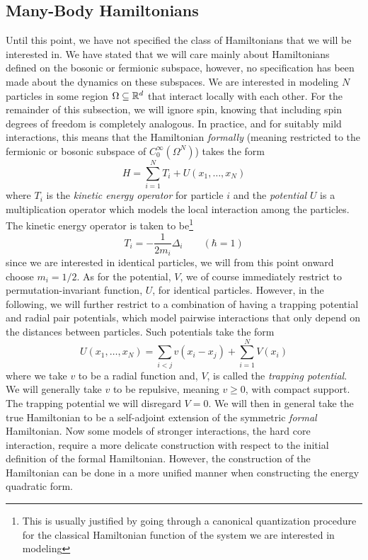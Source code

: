 \subsection{Many-Body Hamiltonians}
Until this point, we have not specified the class of Hamiltonians that we will be interested in. We have stated that we will care mainly about Hamiltonians defined on the bosonic or fermionic subspace, however, no specification has been made about the dynamics on these subspaces. We are interested in modeling $ N $ particles in some region $ \Omega\subseteq\mathbb{R}^d $ that interact locally with each other. For the remainder of this subsection, we will ignore spin, knowing that including spin degrees of freedom is completely analogous. In practice, and for suitably mild interactions, this means that the Hamiltonian \emph{formally} (meaning restricted to the fermionic or bosonic subspace of $ C^\infty_0(\Omega^N) $) takes the form \begin{equation}
H=\sum_{i=1}^{N}T_i+U(x_1,\ldots,x_N)
\end{equation}
where $ T_i $ is the \emph{kinetic energy operator} for particle $ i $ and the \emph{potential} $ U $ is a multiplication operator which models the local interaction among the particles. The kinetic energy operator is taken to be\footnote{This is usually justified by going through a canonical quantization procedure for the classical Hamiltonian function of the system we are interested in modeling} \begin{equation}
T_i=-\frac{1}{2m_i}\Delta_i\qquad (\hbar=1)
\end{equation} 
since we are interested in identical particles, we will from this point onward choose $ m_i=1/2 $. As for the potential, $ V $, we of course immediately restrict to permutation-invariant function, $ U $, for identical particles. However, in the following, we will further restrict to a combination of having a trapping potential and radial pair potentials, which model pairwise interactions that only depend on the distances between particles. Such potentials take the form \begin{equation}
U(x_1,\ldots,x_N)=\sum_{i<j} v(x_i-x_j) + \sum_{i=1}^{N}V(x_i)
\end{equation}
where we take $ v $ to be a radial function and, $ V $, is called the \emph{trapping potential}. We will generally take $ v $ to be repulsive, meaning $ v\geq 0 $, with compact support. The trapping potential we will disregard \ie $ V=0 $. We will then in general take the true Hamiltonian to be a self-adjoint extension of the symmetric \emph{formal} Hamiltonian. Now some models of stronger interactions, \eg the hard core interaction, require a more delicate construction with respect to the initial definition of the formal Hamiltonian. However, the construction of the Hamiltonian can be done in a more unified manner when constructing the energy quadratic form. 
